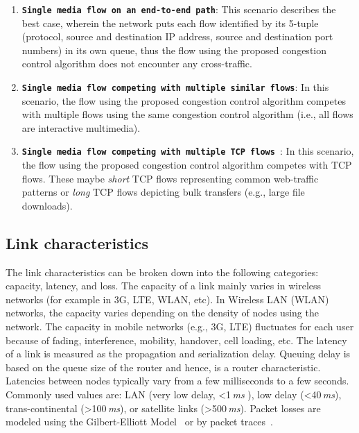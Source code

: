 \begin{enumerate}
\setlength{\itemsep}{0pt}

\item \textbf{\texttt{Single media flow on an end-to-end path}}: This scenario
describes the best case, wherein the network puts each flow identified by its
5-tuple (protocol, source and destination IP address, source and destination
port numbers) in its own queue, thus the flow using the proposed congestion
control algorithm does not encounter any cross-traffic.

\item \textbf{\texttt{Single media flow competing with multiple similar
flows}}: In this scenario, the flow using the proposed congestion control
algorithm competes with multiple flows using the same congestion control algorithm
(i.e., all flows are interactive multimedia).


\item \textbf{\texttt{Single media flow competing with multiple TCP flows }}:
In this scenario, the flow using the proposed congestion control algorithm
competes with TCP flows. These maybe \emph{short} TCP flows representing
common web-traffic patterns or \emph{long} TCP flows depicting bulk transfers
(e.g., large file downloads).

\end{enumerate}





\subsection{Link characteristics}

The link characteristics can be broken down into the following categories:
capacity, latency, and loss. The capacity of a link mainly varies in wireless
networks (for example in 3G, LTE, WLAN, etc). In Wireless LAN (WLAN) networks,
the capacity varies depending on the density of nodes using the network. The capacity in
mobile networks (e.g., 3G, LTE) fluctuates for each user because of fading,
interference, mobility, handover, cell loading, etc. The latency of a link
is measured as the propagation and serialization delay. Queuing delay is based on the
queue size of the router and hence, is a router characteristic. Latencies between
nodes typically vary from a few milliseconds to a few seconds. Commonly used
values are: LAN (very low delay, <1\,\emph{ms} ), low delay (<40\,\emph{ms}),
trans-continental (>100\,\emph{ms}), or satellite links (>500\,\emph{ms}).
Packet losses are modeled using the Gilbert-Elliott
Model~\cite{gilbert1960capacity, elliott1963estimates} or by packet
traces~\cite{ellis:2011:dataset, 3gppSim}.



